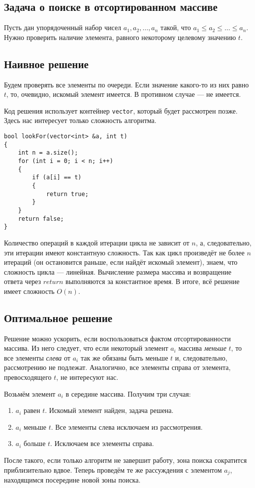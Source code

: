 \subsection{Задача о поиске в отсортированном массиве}
Пусть дан упорядоченный набор чисел $a_1, a_2, \ldots, a_n$ такой, что $a_1 \le a_2 \le \ldots \le a_n$. Нужно проверить наличие элемента, равного некоторому целевому значению $t$.

\subsection*{Наивное решение}
Будем проверять все элементы по очереди. Если значение какого-то из них равно $t$, то, очевидно, искомый элемент имеется. В противном случае --- не имеется.

Код решения использует контейнер \lstinline|vector|, который будет рассмотрен позже. Здесь нас интересует только сложность алгоритма.
\begin{lstlisting}
bool lookFor(vector<int> &a, int t)
{
    int n = a.size();
    for (int i = 0; i < n; i++)
    {
        if (a[i] == t)
        {
            return true;
        }
    }
    return false;
}
\end{lstlisting}

Количество операций в каждой итерации цикла не зависит от $n$, а, следовательно, эти итерации имеют константную сложность. Так как цикл произведёт не более $n$ итераций (он остановится раньше, если найдёт искомый элемент), знаем, что сложность цикла --- линейная. Вычисление размера массива и возвращение ответа через $return$ выполняются за константное время. В итоге, всё решение имеет сложность $O(n)$.

\subsection*{Оптимальное решение}
Решение можно ускорить, если воспользоваться фактом отсортированности массива. Из него следует, что если некоторый элемент $a_i$ массива \emph{меньше} $t$, то все элементы \emph{слева} от $a_i$ так же обязаны быть меньше $t$ и, следовательно, рассмотрению не подлежат. Аналогично, все элементы справа от элемента, превосходящего $t$, не интересуют нас.

Возьмём элемент $a_i$ в середине массива. Получим три случая:
\begin{enumerate}
    \item $a_i$ равен $t$. Искомый элемент найден, задача решена.
    \item $a_i$ меньше $t$. Все элементы слева исключаем из рассмотрения.
    \item $a_i$ больше $t$. Исключаем все элементы справа.
\end{enumerate}
После такого, если только алгоритм не завершит работу, зона поиска сократится приблизительно вдвое. Теперь проведём те же рассуждения с элементом $a_j$, находящимся посередине новой зоны поиска.

